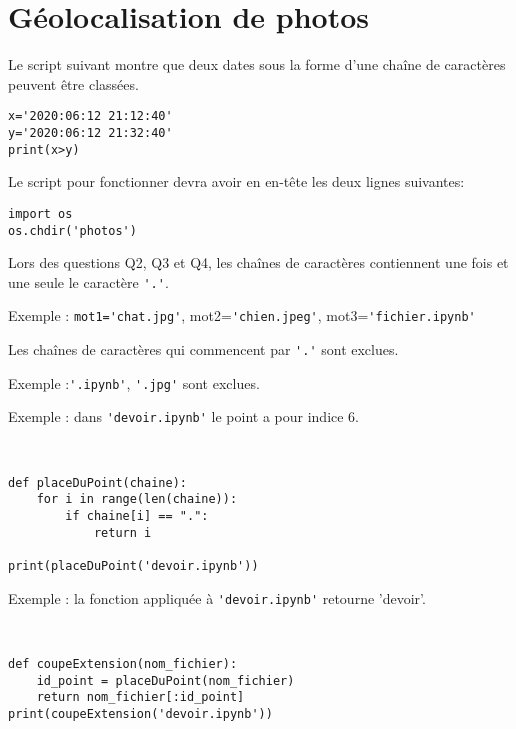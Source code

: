\section{Géolocalisation de photos}

Le script suivant montre que deux dates sous la forme d'une chaîne de caractères peuvent être classées.

\begin{verbatim}
x='2020:06:12 21:12:40'
y='2020:06:12 21:32:40'
print(x>y)
\end{verbatim}

Le script pour fonctionner devra avoir en en-tête les deux lignes suivantes:

\begin{verbatim}
import os
os.chdir('photos')
\end{verbatim}

Lors des questions Q2, Q3 et Q4, les chaînes de caractères contiennent une fois et une seule le caractère \verb?'.'?.

Exemple : \verb?mot1='chat.jpg'?, mot2=\verb?'chien.jpeg'?, mot3=\verb?'fichier.ipynb'?

Les chaînes de caractères qui commencent par \verb?'.'? sont exclues.

Exemple :\verb?'.ipynb'?, \verb?'.jpg'? sont exclues.


Exemple : dans \verb?'devoir.ipynb'? le point a pour indice 6.

\begin{solution}~\ \\
\begin{verbatim}
def placeDuPoint(chaine):
    for i in range(len(chaine)):
        if chaine[i] == ".":
            return i

print(placeDuPoint('devoir.ipynb'))
\end{verbatim}
\end{solution}


Exemple : la fonction appliquée à \verb?'devoir.ipynb'? retourne 'devoir'.

\begin{solution}~\ \\
\begin{verbatim}
def coupeExtension(nom_fichier):
    id_point = placeDuPoint(nom_fichier)
    return nom_fichier[:id_point]
print(coupeExtension('devoir.ipynb'))
\end{verbatim}
\end{solution}

